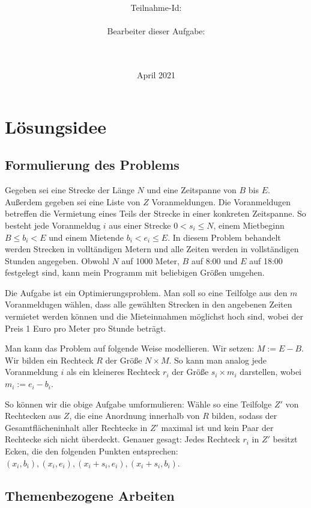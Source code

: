 \documentclass[a4paper,10pt,ngerman]{scrartcl}
\title{\textbf{\Huge\Aufgabe}}
\author{\LARGE Teilnahme-Id: \LARGE \TeilnahmeId \\\\
	    \LARGE Bearbeiter dieser Aufgabe: \\ 
	    \LARGE \Namen\\\\}
\date{\LARGE April 2021}
\newcommand{\TODO}[1]{\todo[inline]{TODO: #1}}
\begin{document}
\maketitle
\tableofcontents

\section{Lösungsidee}

\subsection{Formulierung des Problems}
Gegeben sei eine Strecke der Länge $N$ und eine Zeitspanne von $B$ bis $E$.
Außerdem gegeben sei eine Liste von $Z$ Voranmeldungen. 
Die Voranmeldugen betreffen die Vermietung eines Teils der Strecke in einer konkreten Zeitspanne.
So besteht jede Voranmeldug $i$ aus einer Strecke $0 < s_i \leqslant N$,
einem Mietbeginn $B \leqslant b_i < E$ und einem Mietende $b_i < e_i \leqslant E$.
In diesem Problem behandelt werden Strecken in volltändigen Metern 
und alle Zeiten werden in vollständigen Stunden angegeben.
Obwohl $N$ auf 1000 Meter, $B$ auf 8:00 und $E$ auf 18:00 festgelegt sind,
kann mein Programm mit beliebigen Größen umgehen.

Die Aufgabe ist ein Optimierungsproblem.
Man soll so eine Teilfolge aus den $m$ Voranmeldugen wählen,
dass alle gewählten Strecken in den angebenen Zeiten vermietet werden können
und die Mieteinnahmen möglichst hoch sind, wobei der Preis 1 Euro pro Meter pro Stunde beträgt.

Man kann das Problem auf folgende Weise modellieren. 
Wir setzen: $M := E - B$.
Wir bilden ein Rechteck $R$ der Größe $N \times M$.
So kann man analog jede Voranmeldung $i$ als ein kleineres Rechteck 
$r_i$ der Größe $s_i \times m_i$ darstellen, wobei $m_i := e_i - b_i$.

So können wir die obige Aufgabe umformulieren:
Wähle so eine Teilfolge $Z'$ von Rechtecken aus $Z$,
die eine Anordnung innerhalb von $R$ bilden,
sodass der Gesamtflächeninhalt aller Rechtecke in $Z'$ maximal ist und
kein Paar der Rechtecke sich nicht überdeckt.
Genauer gesagt: Jedes Rechteck $r_i$ in $Z'$ besitzt Ecken,
die den folgenden Punkten entsprechen:
$(x_i, b_i), (x_i, e_i), (x_i + s_i, e_i), (x_i + s_i, b_i)$.

\TODO{check, reformulate}

\subsection{Themenbezogene Arbeiten}
\end{document}
